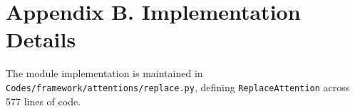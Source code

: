 \section*{Appendix B. Implementation Details}
The module implementation is maintained in \texttt{Codes/framework/attentions/replace.py}, defining \texttt{ReplaceAttention} across 577 lines of code.
